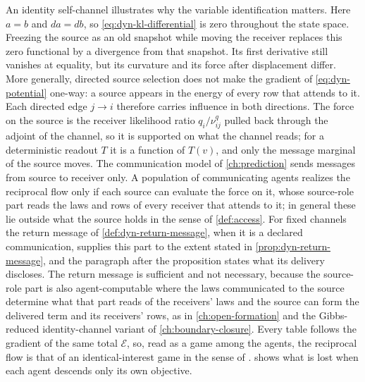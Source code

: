An identity self-channel illustrates why the variable identification matters. Here $a=b$ and $da=db$, so \cref{eq:dyn-kl-differential} is zero throughout the state space. Freezing the source as an old snapshot while moving the receiver replaces this zero functional by a divergence from that snapshot. Its first derivative still vanishes at equality, but its curvature and its force after displacement differ. More generally, directed source selection does not make the gradient of \cref{eq:dyn-potential} one-way: a source appears in the energy of every row that attends to it. Each directed edge $j\to i$ therefore carries influence in both directions. The force on the source is the receiver likelihood ratio $q_i/\nu^q_{ij}$ pulled back through the adjoint of the channel, so it is supported on what the channel reads; for a deterministic readout $T$ it is a function of $T(v)$, and only the message marginal of the source moves. The communication model of \cref{ch:prediction} sends messages from source to receiver only. A population of communicating agents realizes the reciprocal flow only if each source can evaluate the force on it, whose source-role part reads the laws and rows of every receiver that attends to it; in general these lie outside what the source holds in the sense of \cref{def:access}. For fixed channels the return message of \cref{def:dyn-return-message}, when it is a declared communication, supplies this part to the extent stated in \cref{prop:dyn-return-message}, and the paragraph after the proposition states what its delivery discloses. The return message is sufficient and not necessary, because the source-role part is also agent-computable where the laws communicated to the source determine what that part reads of the receivers' laws and the source can form the delivered term and its receivers' rows, as in \cref{ch:open-formation} and the Gibbs-reduced identity-channel variant of \cref{ch:boundary-closure}. Every table follows the gradient of the same total $\mathcal E$, so, read as a game among the agents, the reciprocal flow is that of an identical-interest game in the sense of \citet{MondererShapley1996}.  shows what is lost when each agent descends only its own objective.

